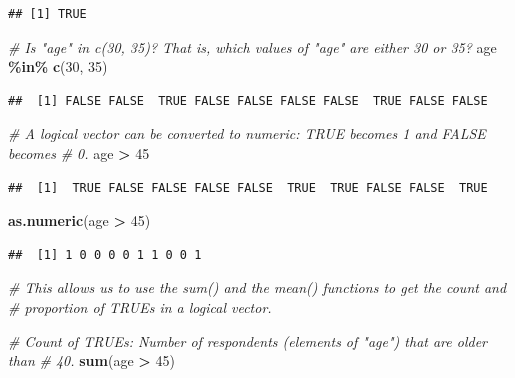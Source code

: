 \documentclass[
]{book}
\newenvironment{Shaded}{\begin{snugshade}}{\end{snugshade}}
\newcommand{\CommentTok}[1]{\textcolor[rgb]{0.56,0.35,0.01}{\textit{#1}}}
\newcommand{\DecValTok}[1]{\textcolor[rgb]{0.00,0.00,0.81}{#1}}
\newcommand{\FunctionTok}[1]{\textcolor[rgb]{0.13,0.29,0.53}{\textbf{#1}}}
\newcommand{\NormalTok}[1]{#1}
\newcommand{\SpecialCharTok}[1]{\textcolor[rgb]{0.81,0.36,0.00}{\textbf{#1}}}
\begin{document}
\begin{verbatim}
## [1] TRUE
\end{verbatim}

\begin{Shaded}
\begin{Highlighting}[]
\CommentTok{\# Is "age" in c(30, 35)? That is, which values of "age" are either 30 or 35?}
\NormalTok{age }\SpecialCharTok{\%in\%} \FunctionTok{c}\NormalTok{(}\DecValTok{30}\NormalTok{, }\DecValTok{35}\NormalTok{)}
\end{Highlighting}
\end{Shaded}

\begin{verbatim}
##  [1] FALSE FALSE  TRUE FALSE FALSE FALSE FALSE  TRUE FALSE FALSE
\end{verbatim}

\begin{Shaded}
\begin{Highlighting}[]
\CommentTok{\# A logical vector can be converted to numeric: TRUE becomes 1 and FALSE becomes}
\CommentTok{\# 0.}
\NormalTok{age }\SpecialCharTok{\textgreater{}} \DecValTok{45}
\end{Highlighting}
\end{Shaded}

\begin{verbatim}
##  [1]  TRUE FALSE FALSE FALSE FALSE  TRUE  TRUE FALSE FALSE  TRUE
\end{verbatim}

\begin{Shaded}
\begin{Highlighting}[]
\FunctionTok{as.numeric}\NormalTok{(age }\SpecialCharTok{\textgreater{}} \DecValTok{45}\NormalTok{)}
\end{Highlighting}
\end{Shaded}

\begin{verbatim}
##  [1] 1 0 0 0 0 1 1 0 0 1
\end{verbatim}

\begin{Shaded}
\begin{Highlighting}[]
\CommentTok{\# This allows us to use the sum() and the mean() functions to get the count and}
\CommentTok{\# proportion of TRUE\textquotesingle{}s in a logical vector.}

\CommentTok{\# Count of TRUE\textquotesingle{}s: Number of respondents (elements of "age") that are older than}
\CommentTok{\# 40.}
\FunctionTok{sum}\NormalTok{(age }\SpecialCharTok{\textgreater{}} \DecValTok{45}\NormalTok{)}
\end{Highlighting}
\end{Shaded}
\end{document}
